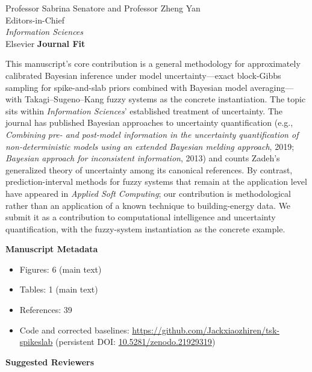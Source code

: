 \documentclass[11pt]{letter}
\begin{document}
\begin{letter}{Professor Sabrina Senatore and Professor Zheng Yan \\ Editors-in-Chief \\ \textit{Information Sciences} \\ Elsevier}
\noindent\textbf{Journal Fit}

This manuscript's core contribution is a general methodology for approximately calibrated Bayesian inference under model uncertainty---exact block-Gibbs sampling for spike-and-slab priors combined with Bayesian model averaging---with Takagi--Sugeno--Kang fuzzy systems as the concrete instantiation.
The topic sits within \textit{Information Sciences}' established treatment of uncertainty.
The journal has published Bayesian approaches to uncertainty quantification (e.g., \emph{Combining pre- and post-model information in the uncertainty quantification of non-deterministic models using an extended Bayesian melding approach}, 2019; \emph{Bayesian approach for inconsistent information}, 2013) and counts Zadeh's generalized theory of uncertainty among its canonical references. By contrast, prediction-interval methods for fuzzy systems that remain at the application level have appeared in \emph{Applied Soft Computing}; our contribution is methodological rather than an application of a known technique to building-energy data. We submit it as a contribution to computational intelligence and uncertainty quantification, with the fuzzy-system instantiation as the concrete example.

\noindent\textbf{Manuscript Metadata}

\begin{itemize}
\item Figures: 6 (main text)
\item Tables: 1 (main text)
\item References: 39
\item Code and corrected baselines: \url{https://github.com/Jackxiaozhiren/tsk-spikeslab} (persistent DOI: \href{https://doi.org/10.5281/zenodo.21929319}{10.5281/zenodo.21929319})
\end{itemize}

\noindent\textbf{Suggested Reviewers}


\end{letter}
\end{document}
